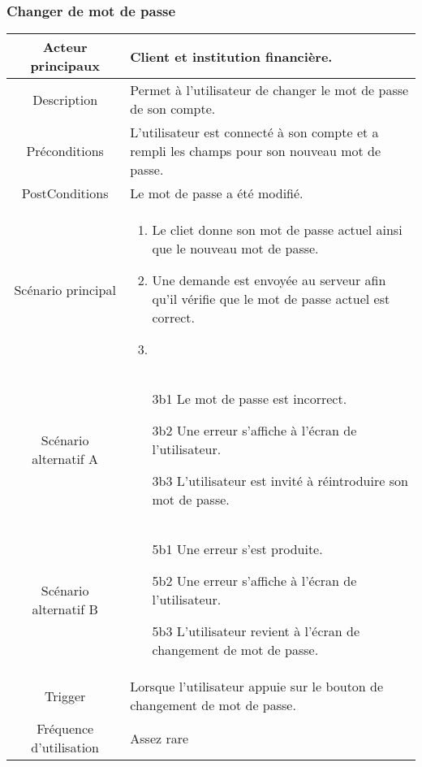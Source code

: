 \documentclass{article}
\begin{document}
\subsubsection{Changer de mot de passe}
\begin{table}[h]
   \begin{tabular}{|c|p{10cm}|}
      \hline
      Acteur principaux&Client et institution financière. \\
      \hline
      Description&Permet à l'utilisateur de changer le mot de passe de son compte.\\
      \hline
      Préconditions&L'utilisateur est connecté à son compte et a rempli les champs pour son nouveau mot de passe.\\
      \hline
      PostConditions&Le mot de passe a été modifié.\\
      \hline
      Scénario principal& 
            \begin{enumerate}
               \item Le cliet donne son mot de passe actuel ainsi que le nouveau mot de passe.
               \item Une demande est envoyée au serveur afin qu'il vérifie que le mot de passe actuel est correct.
               \item 
            \end{enumerate}     \\
      \hline
      Scénario alternatif A&
               \begin{itemize}
                  \item[3b1] Le mot de passe est incorrect.
                  \item[3b2] Une erreur s'affiche à l'écran de l'utilisateur.
                  \item[3b3] L'utilisateur est invité à réintroduire son mot de passe. 
               \end{itemize}      \\
      \hline
      Scénario alternatif B& 
               \begin{itemize}
                  \item[5b1] Une erreur s'est produite.
                  \item[5b2] Une erreur s'affiche à l'écran de l'utilisateur.
                  \item[5b3] L'utilisateur revient à l'écran de changement de mot de passe.   
               \end{itemize} \\
      \hline
      Trigger&Lorsque l'utilisateur appuie sur le bouton de changement de mot de passe.\\
      \hline
      Fréquence d'utilisation&Assez rare\\
      \hline
   \end{tabular}
\end{table}
\end{document}
